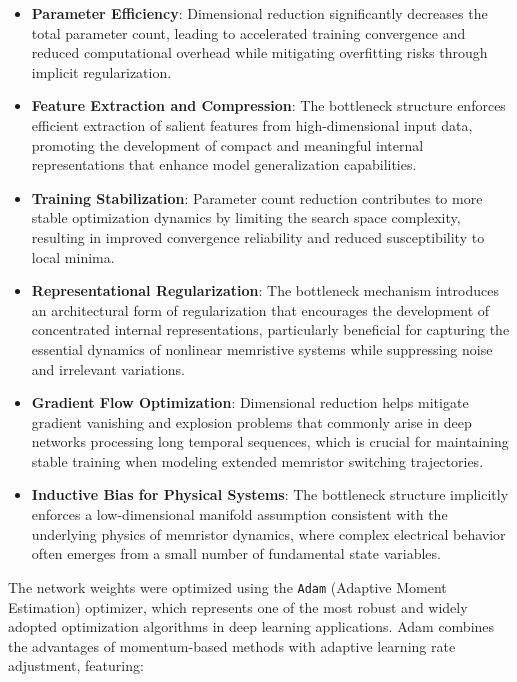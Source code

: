 \documentclass[11pt, oneside]{article}
\begin{document}
\begin{itemize}
    \item \textbf{Parameter Efficiency}: Dimensional reduction significantly decreases the total parameter count, leading to accelerated training convergence and reduced computational overhead while mitigating overfitting risks through implicit regularization.

    \item \textbf{Feature Extraction and Compression}: The bottleneck structure enforces efficient extraction of salient features from high-dimensional input data, promoting the development of compact and meaningful internal representations that enhance model generalization capabilities.

    \item \textbf{Training Stabilization}: Parameter count reduction contributes to more stable optimization dynamics by limiting the search space complexity, resulting in improved convergence reliability and reduced susceptibility to local minima.

    \item \textbf{Representational Regularization}: The bottleneck mechanism introduces an architectural form of regularization that encourages the development of concentrated internal representations, particularly beneficial for capturing the essential dynamics of nonlinear memristive systems while suppressing noise and irrelevant variations.

    \item \textbf{Gradient Flow Optimization}: Dimensional reduction helps mitigate gradient vanishing and explosion problems that commonly arise in deep networks processing long temporal sequences, which is crucial for maintaining stable training when modeling extended memristor switching trajectories.

    \item \textbf{Inductive Bias for Physical Systems}: The bottleneck structure implicitly enforces a low-dimensional manifold assumption consistent with the underlying physics of memristor dynamics, where complex electrical behavior often emerges from a small number of fundamental state variables.
\end{itemize}

The network weights were optimized using the \texttt{Adam} (Adaptive Moment Estimation) optimizer, which represents one of the most robust and widely adopted optimization algorithms in deep learning applications. Adam combines the advantages of momentum-based methods with adaptive learning rate adjustment, featuring:
\end{document}
